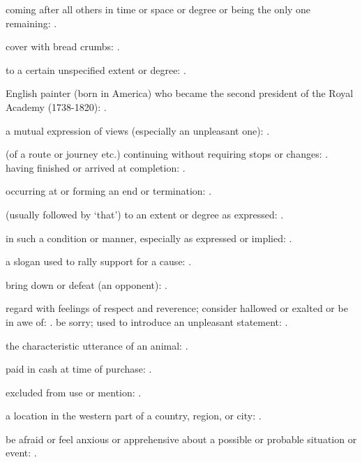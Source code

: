   coming after all others in time or space or degree or being the only one remaining: .

  cover with bread crumbs: .

  to a certain unspecified extent or degree: .

  English painter (born in America) who became the second president of the Royal Academy (1738-1820):   .

  a mutual expression of views (especially an unpleasant one): .

  (of a route or journey etc.) continuing without requiring stops or changes: . having finished or arrived at completion:   .

  occurring at or forming an end or termination:   .

  (usually followed by `that') to an extent or degree as expressed: .

  in such a condition or manner, especially as expressed or implied: .

  a slogan used to rally support for a cause:   .

  bring down or defeat (an opponent): .

  regard with feelings of respect and reverence; consider hallowed or exalted or be in awe of:   . be sorry; used to introduce an unpleasant statement: .

  the characteristic utterance of an animal: .

  paid in cash at time of purchase: .

  excluded from use or mention:   .

  a location in the western part of a country, region, or city: .

  be afraid or feel anxious or apprehensive about a possible or probable situation or event: .

